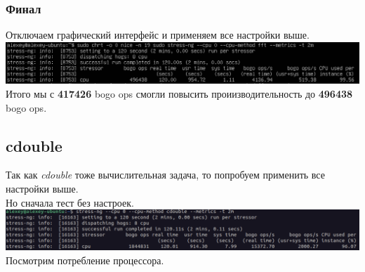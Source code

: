 \documentclass[12pt,onecolumn]{article}
\begin{document}
\subsubsection{Финал}
Отключаем графический интерфейс и применяем все настройки выше. \\
\includegraphics[width=\textwidth]{image/cpu-max.png}
Итого мы с \textbf{417426} bogo ops смогли повысить проиизводительность до \textbf{496438} bogo ops.
\subsection{cdouble}
Так как \textit{cdouble} тоже вычислительная задача, то попробуем применить все настройки выше.\\
Но сначала тест без настроек. \\
\includegraphics[width=\textwidth]{image/cdouble-1.png}
Посмотрим потребление процессора.\\
\end{document}
